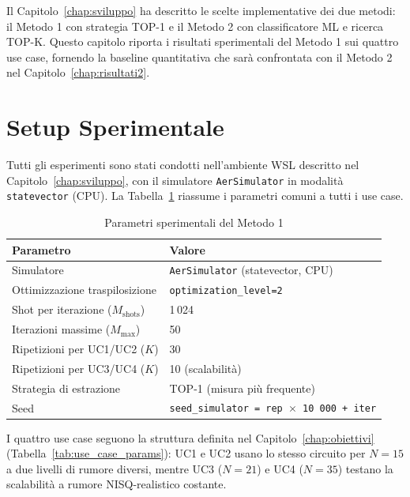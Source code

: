 \begin{onehalfspace}

Il Capitolo~\ref{chap:sviluppo} ha descritto le scelte implementative dei due metodi: il Metodo 1 con strategia TOP-1 e il Metodo 2 con classificatore ML e ricerca TOP-K. Questo capitolo riporta i risultati sperimentali del Metodo 1 sui quattro use case, fornendo la baseline quantitativa che sarà confrontata con il Metodo 2 nel Capitolo~\ref{chap:risultati2}.

\section{Setup Sperimentale}
\label{sec:setup_m1}

Tutti gli esperimenti sono stati condotti nell'ambiente WSL descritto nel Capitolo~\ref{chap:sviluppo}, con il simulatore \texttt{AerSimulator} in modalità \texttt{statevector} (CPU). La Tabella~\ref{tab:setup_m1} riassume i parametri comuni a tutti i use case.

\begin{table}[H]
\centering
\caption{Parametri sperimentali del Metodo 1}
\label{tab:setup_m1}
\begin{tabular}{ll}
\hline
\textbf{Parametro} & \textbf{Valore} \\
\hline
Simulatore & \texttt{AerSimulator} (statevector, CPU) \\
Ottimizzazione traspilosizione & \texttt{optimization\_level=2} \\
Shot per iterazione ($M_{\text{shots}}$) & 1\,024 \\
Iterazioni massime ($M_{\text{max}}$) & 50 \\
Ripetizioni per UC1/UC2 ($K$) & 30 \\
Ripetizioni per UC3/UC4 ($K$) & 10 (scalabilità) \\
Strategia di estrazione & TOP-1 (misura più frequente) \\
Seed & \texttt{seed\_simulator = rep $\times$ 10\,000 + iter} \\
\hline
\end{tabular}
\end{table}

I quattro use case seguono la struttura definita nel Capitolo~\ref{chap:obiettivi} (Tabella~\ref{tab:use_case_params}): UC1 e UC2 usano lo stesso circuito per $N=15$ a due livelli di rumore diversi, mentre UC3 ($N=21$) e UC4 ($N=35$) testano la scalabilità a rumore NISQ-realistico costante.


\end{onehalfspace}
